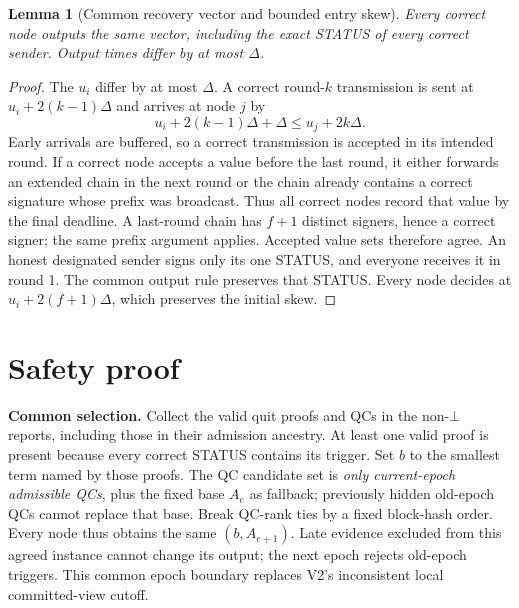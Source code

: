 \documentclass[10pt,a4paper]{article}
\newtheorem{lemma}{Lemma}
\begin{document}
\begin{lemma}[Common recovery vector and bounded entry skew]
Every correct node outputs the same vector, including the exact STATUS of
every correct sender. Output times differ by at most $\Delta$.
\end{lemma}
\begin{proof}
The $u_i$ differ by at most $\Delta$. A correct round-$k$ transmission is
sent at $u_i+2(k-1)\Delta$ and arrives at node $j$ by
\[
 u_i+2(k-1)\Delta+\Delta\le u_j+2k\Delta.
\]
Early arrivals are buffered, so a correct transmission is accepted in its
intended round. If a correct node accepts a value before the last round,
it either forwards an extended chain in the next round or the chain already
contains a correct signature whose prefix was broadcast. Thus all correct
nodes record that value by the final deadline. A last-round chain has
$f+1$ distinct signers, hence a correct signer; the same prefix argument
applies. Accepted value sets therefore agree. An honest designated sender
signs only its one STATUS, and everyone receives it in round 1. The common
output rule preserves that STATUS. Every node decides at $u_i+2(f+1)\Delta$,
which preserves the initial skew.
\end{proof}

\clearpage
\section*{Safety proof}
\textbf{Common selection.} Collect the valid quit proofs and QCs in the
non-$\bot$ reports, including those in their admission ancestry. At least one
valid proof is present because every correct STATUS contains its trigger.
Set $b$ to the smallest term named by those proofs. The QC candidate set is
\emph{only current-epoch admissible QCs}, plus the fixed base $A_e$ as fallback;
previously hidden old-epoch QCs cannot replace that base. Break QC-rank ties
by a fixed block-hash order. Every node thus obtains the same $(b,A_{e+1})$.
Late evidence excluded from this agreed instance cannot change its output;
the next epoch rejects old-epoch triggers. This common epoch boundary
replaces V2's inconsistent local committed-view cutoff.
\end{document}
